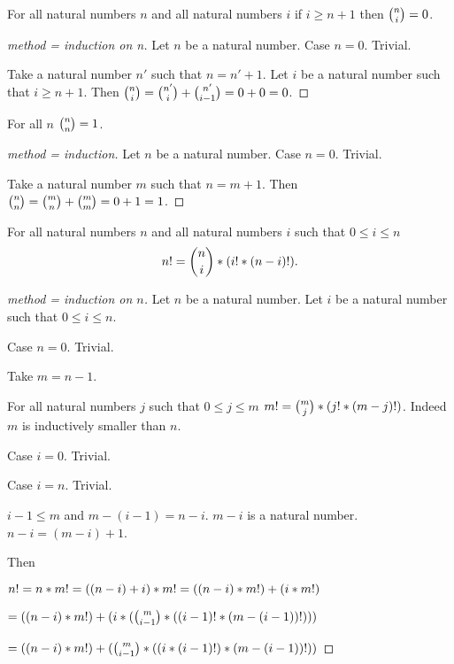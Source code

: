 \documentclass[11pt]{article}
\begin{document}
\begin{forthel}
\begin{theorem} For all natural numbers $n$ and 
all natural numbers $i$
if $i \geq n + 1$ then ${n \choose i} = 0$.
\end{theorem}
\begin{proof}[method = induction on n]
Let $n$ be a natural number.
Case $n = 0$. Trivial.

Take a natural number $n'$ such that $n = n' + 1$.
Let $i$ be a natural number such that $i \geq n + 1$.
Then ${n \choose i} = {n' \choose i} + {n' \choose i-1} = 0 + 0 = 0$.
\end{proof}


\begin{theorem} For all $n$
${n \choose n} = 1$.
\end{theorem}
\begin{proof}[method = induction]
Let $n$ be a natural number.
Case $n = 0$. Trivial.

Take a natural number $m$ such that $n = m + 1$.
Then ${n \choose n} = {m \choose n} + {m \choose m} = 0 + 1 = 1$.

\end{proof}

\begin{lemma} For all natural numbers $n$ and all natural numbers $i$ 
such that  $0 \leq i \leq n$
\[n ! = {n \choose i} * (i ! * (n-i) !).\]
\end{lemma}

\begin{proof}[method = induction on $n$]
Let $n$ be a natural number.
Let $i$ be a natural number such that $0 \leq i \leq n$.

Case $n = 0$. Trivial.

Take $m = n - 1$.  

For all natural numbers $j$ such that $0 \leq j \leq m$ $m ! = 
{m \choose j} * (j ! * (m-j) !)$.
Indeed $m$ is inductively smaller than $n$.

Case $i = 0$. Trivial.

Case $i = n$. Trivial.

$i - 1 \leq m$ and $m - (i-1) = n - i$. $m - i$ is a natural number. 
$n - i = (m - i) + 1$.

Then

$n ! = n * m ! = ((n-i) + i) * m ! = ((n-i) * m !) + (i * m !)$

$= ((n-i) * m !) + (i * ({m \choose i-1} * ((i-1) ! * (m - (i-1)) !)))$

$= ((n-i) * m !) + ({m \choose i-1} * ((i * (i-1) !) * (m - (i-1)) !))$


\end{proof}
\end{forthel}
\end{document}
